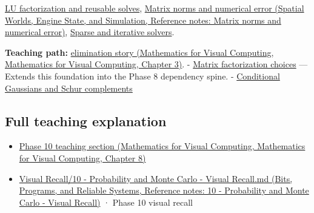 \hyperref[appendix-55e4b5b0a1e6]{LU factorization and reusable solves}, \href{../05-Spatial-Worlds-Engine-State-and-Simulation/main.pdf\#nameddest=appendix-f8657bac66e5}{Matrix norms and numerical error (Spatial Worlds, Engine State, and Simulation, Reference notes: Matrix norms and numerical error)}, \hyperref[appendix-67c87a3d9e94]{Sparse and iterative solvers}.

\textbf{Teaching path:} \href{../02-Mathematics-for-Visual-Computing/main.pdf\#nameddest=01-foundations-i-ch019-elimination-turns-the-geometry-into-an-auditable-calculation}{elimination story (Mathematics for Visual Computing, Mathematics for Visual Computing, Chapter 3)}. - \hyperref[appendix-221a483bec2d]{Matrix factorization choices} --- Extends this foundation into the Phase 8 dependency spine. - \hyperref[appendix-f0437ea55a47]{Conditional Gaussians and Schur complements}

\subsection{Full teaching explanation}\label{appendix-f6e77f4a200f-full-teaching-explanation}

\begin{itemize}
\tightlist
\item
  \href{../02-Mathematics-for-Visual-Computing/main.pdf\#nameddest=02-foundations-ii-ch024-waiting-times-event-counts-and-covariance-geometry}{Phase 10 teaching section (Mathematics for Visual Computing, Mathematics for Visual Computing, Chapter 8)}
\item
  \href{../01-Bits-Programs-and-Reliable-Systems/main.pdf\#nameddest=appendix-cb5af353ef77}{Visual Recall/10 - Probability and Monte Carlo - Visual Recall.md (Bits, Programs, and Reliable Systems, Reference notes: 10 - Probability and Monte Carlo - Visual Recall)} · Phase 10 visual recall
\end{itemize}
